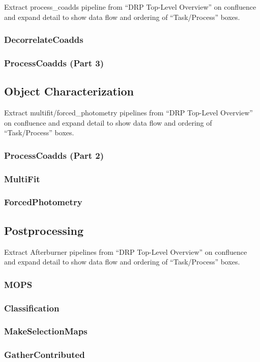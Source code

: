 \begin{note}
Extract process\_coadds pipeline from ``DRP Top-Level Overview'' on confluence and expand detail to show data flow and ordering of ``Task/Process'' boxes.
\end{note}

\subsubsection{DecorrelateCoadds}
\subsubsection{ProcessCoadds (Part 3)}

\subsection{Object Characterization}

\begin{note}
Extract multifit/forced\_photometry pipelines from ``DRP Top-Level Overview'' on confluence and expand detail to show data flow and ordering of ``Task/Process'' boxes.
\end{note}

\subsubsection{ProcessCoadds (Part 2)}
\subsubsection{MultiFit}
\subsubsection{ForcedPhotometry}

\subsection{Postprocessing}

\begin{note}
Extract Afterburner pipelines from ``DRP Top-Level Overview'' on confluence and expand detail to show data flow and ordering of ``Task/Process'' boxes.
\end{note}

\subsubsection{MOPS}
\subsubsection{Classification}
\subsubsection{MakeSelectionMaps}
\subsubsection{GatherContributed}
